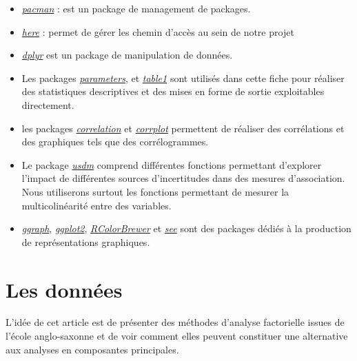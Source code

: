 \documentclass[
  french,
  11pt,
  a4paper,
]{article}
\begin{document}
\begin{itemize}
\item
  \emph{\href{https://cran.r-project.org/web/packages/pacman/index.html}{pacman}}
  : est un package de management de packages.
\item
  \emph{\href{https://cran.r-project.org/web/packages/here/index.html}{here}}
  : permet de gérer les chemin d'accès au sein de notre projet
\item
  \emph{\href{https://cran.r-project.org/web/packages/dplyr/index.html}{dplyr}}
  est un package de manipulation de données.
\item
  Les packages
  \emph{\href{https://cran.r-project.org/web/packages/parameters/index.html}{parameters}},
  et
  \emph{\href{https://cran.r-project.org/web/packages/table1/vignettes/table1-examples.html}{table1}}
  sont utilisés dans cette fiche pour réaliser des statistiques
  descriptives et des mises en forme de sortie exploitables directement.
\item
  les packages
  \emph{\href{https://cran.r-project.org/web/packages/correlation/index.html}{correlation}}
  et
  \emph{\href{https://cran.r-project.org/web/packages/corrplot/vignettes/corrplot-intro.html}{corrplot}}
  permettent de réaliser des corrélations et des graphiques tels que des
  corrélogrammes.
\item
  Le package
  \emph{\href{https://cran.r-project.org/web/packages/usdm/usdm.pdf}{usdm}}
  comprend différentes fonctions permettant d'explorer l'impact de
  différentes sources d'incertitudes dans des mesures d'association.
  Nous utiliserons surtout les fonctions permettant de mesurer la
  multicolinéarité entre des variables.
\item
  \emph{\href{https://cran.r-project.org/web/packages/ggraph/index.html}{ggraph}},
  \emph{\href{https://cran.r-project.org/web/packages/ggplot2/index.html}{ggplot2}},
  \emph{\href{https://cran.r-project.org/web/packages/RColorBrewer/index.html}{RColorBrewer}}
  et
  \emph{\href{https://cran.r-project.org/web/packages/see/index.html}{see}}
  sont des packages dédiés à la production de représentations
  graphiques.
\end{itemize}

\section{Les données}\label{les-donnuxe9es}

L'idée de cet article est de présenter des méthodes d'analyse
factorielle issues de l'école anglo-saxonne et de voir comment elles
peuvent constituer une alternative aux analyses en composantes
principales.
\end{document}
